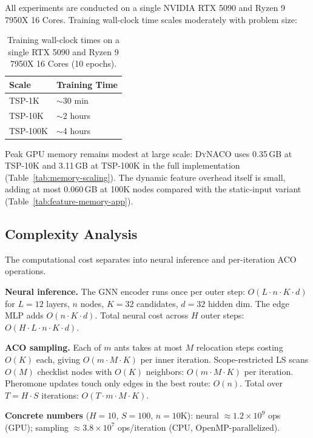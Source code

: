 \documentclass[sigconf]{acmart}
\newcommand{\DyNACO}{\textsc{DyNACO}}
\begin{document}
All experiments are conducted on a single NVIDIA RTX 5090 and Ryzen 9 7950X 16 Cores.
Training wall-clock time scales moderately with problem size:

\begin{table}[h]
\centering
\caption{Training wall-clock times on a single RTX 5090 and Ryzen 9 7950X 16 Cores (10 epochs).}
\label{tab:training-times}
\small
\begin{tabularx}{\columnwidth}{lY}
\toprule
Scale & Training Time \\
\midrule
TSP-1K   & $\sim$30 min \\
TSP-10K  & $\sim$2 hours \\
TSP-100K & $\sim$4 hours \\
\bottomrule
\end{tabularx}
\end{table}

Peak GPU memory remains modest at large scale: \DyNACO{} uses 0.35\,GB at TSP-10K and 3.11\,GB at TSP-100K in the full implementation (Table~\ref{tab:memory-scaling}). The dynamic feature overhead itself is small, adding at most 0.060\,GB at 100K nodes compared with the static-input variant (Table~\ref{tab:feature-memory-app}).

\subsection{Complexity Analysis}
\label{app:complexity}

The computational cost separates into neural inference and per-iteration ACO operations.

\textbf{Neural inference.}
The GNN encoder runs once per outer step: $O(L \cdot n \cdot K \cdot d)$ for $L{=}12$ layers, $n$ nodes, $K{=}32$ candidates, $d{=}32$ hidden dim.
The edge MLP adds $O(n \cdot K \cdot d)$.
Total neural cost across $H$ outer steps: $O(H \cdot L \cdot n \cdot K \cdot d)$.

\textbf{ACO sampling.}
Each of $m$ ants takes at most $M$ relocation steps costing $O(K)$ each, giving $O(m \cdot M \cdot K)$ per inner iteration.
Scope-restricted LS scans $O(M)$ checklist nodes with $O(K)$ neighbors: $O(m \cdot M \cdot K)$ per iteration.
Pheromone updates touch only edges in the best route: $O(n)$.
Total over $T{=}H \cdot S$ iterations: $O(T \cdot m \cdot M \cdot K)$.

\textbf{Concrete numbers} ($H{=}10$, $S{=}100$, $n{=}10$K):
neural $\approx 1.2 \times 10^9$ ops (GPU); sampling $\approx 3.8 \times 10^7$ ops/iteration (CPU, OpenMP-parallelized).
\end{document}
